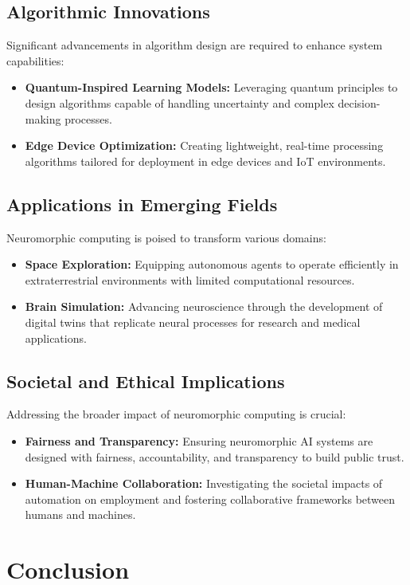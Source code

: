 \documentclass{article}
\theoremstyle{plain}
\begin{document}
\subsection{Algorithmic Innovations}
Significant advancements in algorithm design are required to enhance system capabilities:
\begin{itemize}
    \item \textbf{Quantum-Inspired Learning Models:} Leveraging quantum principles to design algorithms capable of handling uncertainty and complex decision-making processes.
    \item \textbf{Edge Device Optimization:} Creating lightweight, real-time processing algorithms tailored for deployment in edge devices and IoT environments.
\end{itemize}

\subsection{Applications in Emerging Fields}
Neuromorphic computing is poised to transform various domains:
\begin{itemize}
    \item \textbf{Space Exploration:} Equipping autonomous agents to operate efficiently in extraterrestrial environments with limited computational resources.
    \item \textbf{Brain Simulation:} Advancing neuroscience through the development of digital twins that replicate neural processes for research and medical applications.
\end{itemize}

\subsection{Societal and Ethical Implications}
Addressing the broader impact of neuromorphic computing is crucial:
\begin{itemize}
    \item \textbf{Fairness and Transparency:} Ensuring neuromorphic AI systems are designed with fairness, accountability, and transparency to build public trust.
    \item \textbf{Human-Machine Collaboration:} Investigating the societal impacts of automation on employment and fostering collaborative frameworks between humans and machines.
\end{itemize}


\section{Conclusion}
\end{document}
